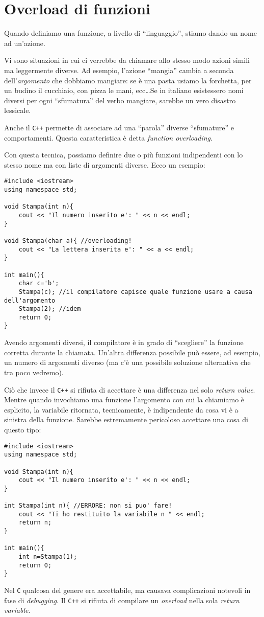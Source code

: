 \section{Overload di funzioni}
Quando definiamo una funzione, a livello di ``linguaggio'', stiamo dando un nome ad un'azione. 

Vi sono situazioni in cui ci verrebbe da chiamare allo stesso modo azioni simili ma leggermente diverse. Ad esempio, l'azione ``mangia'' cambia a seconda dell'\emph{argomento} che dobbiamo mangiare: se è una pasta usiamo la forchetta, per un budino il cucchiaio, con  pizza le mani, ecc\ldots Se in italiano esistessero nomi diversi per ogni ``sfumatura'' del verbo mangiare, sarebbe un vero disastro lessicale.

Anche il \verb|C++| permette di associare ad una ``parola'' diverse ``sfumature'' e comportamenti. Questa caratteristica è detta \emph{function overloading}. 

Con questa tecnica, possiamo definire due o più funzioni indipendenti con lo stesso nome ma con liste di argomenti diverse. Ecco un esempio:

\begin{lstlisting}
#include <iostream>
using namespace std;

void Stampa(int n){
	cout << "Il numero inserito e': " << n << endl;
}

void Stampa(char a){ //overloading!
	cout << "La lettera inserita e': " << a << endl;
}

int main(){
	char c='b';
	Stampa(c); //il compilatore capisce quale funzione usare a causa dell'argomento
	Stampa(2); //idem
	return 0;
}
\end{lstlisting}

Avendo argomenti diversi, il compilatore è in grado di ``scegliere'' la funzione corretta durante la chiamata. Un'altra differenza possibile può essere, ad esempio, un numero di argomenti diverso (ma c'è una possibile soluzione alternativa che tra poco vedremo). 

Ciò che invece il \verb|C++| si rifiuta di accettare è una differenza nel solo \emph{return value}. Mentre quando invochiamo una funzione l'argomento con cui la chiamiamo è esplicito, la variabile ritornata, tecnicamente, è indipendente da cosa vi è a sinistra della funzione. Sarebbe estremamente pericoloso accettare una cosa di questo tipo:
\begin{lstlisting}
#include <iostream>
using namespace std;

void Stampa(int n){
	cout << "Il numero inserito e': " << n << endl;
}

int Stampa(int n){ //ERRORE: non si puo' fare!
	cout << "Ti ho restituito la variabile n " << endl;
	return n;
}

int main(){
	int n=Stampa(1); 
	return 0;
}
\end{lstlisting}
Nel \verb|C| qualcosa del genere era accettabile, ma causava complicazioni notevoli in fase di \emph{debugging}. Il \verb|C++| si rifiuta di compilare un \emph{overload} nella sola \emph{return variable}.

